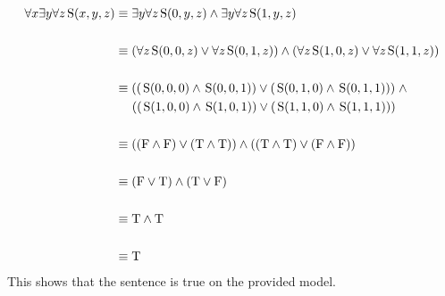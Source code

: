 \documentclass{article}
\newcommand{\True}{\textnormal{T}}
\newcommand{\False}{\textnormal{F}}
\newcommand{\predS}{\hspace{0.05cm} \textnormal{S}}
\newcommand{\predicate}{\predS (x,y,z)}
\begin{document}
\begin{enumerate}
{\begin{center}
    $ $
    \end{center}
    }
    {
    \begin{align*}
    \forall x \exists y \forall z \predicate &\equiv \exists y \forall z \predS(0,y,z) \land \exists y \forall z \predS(1,y,z) \\ \\
    &\equiv (\forall z \predS(0,0,z) \lor \forall z \predS(0,1,z)) \land (\forall z \predS(1,0,z) \lor \forall z \predS(1,1,z)) \\ \\
    &\equiv ((\predS(0,0,0) \land \predS(0,0,1)) \lor (\predS(0,1,0) \land \predS(0,1,1))) \hspace{0.1cm} \land \\
    & \hspace{0.48cm} ((\predS(1,0,0) \land \predS(1,0,1)) \lor (\predS(1,1,0) \land \predS(1,1,1))) \\ \\
    &\equiv ((\False \land \False) \lor (\True \land \True)) \land ((\True \land \True) \lor (\False \land \False)) \\ \\
    &\equiv (\False \lor \True) \land (\True \lor \False)\\ \\
    &\equiv \True \land \True \\ \\
    &\equiv \True \\ 
    \end{align*}
    This shows that the sentence is true on the provided model.
    }

    \pagebreak


\end{enumerate}
\end{document}
